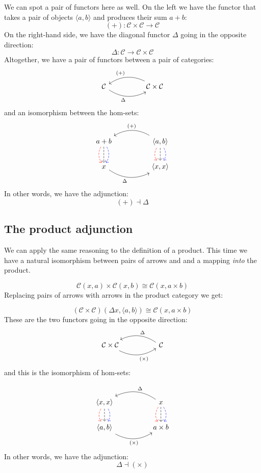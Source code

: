 \documentclass[DaoFP]{subfiles}
\begin{document}
We can spot a pair of functors here as well. On the left we have the functor that takes a pair of objects $\langle a, b \rangle$ and produces their sum $a + b$:
\[ (+) \colon \mathcal{C} \times \mathcal{C} \to \mathcal{C}\]
On the right-hand side, we have the diagonal functor $\Delta$ going in the opposite direction:
\[ \Delta \colon \mathcal{C} \to  \mathcal{C} \times \mathcal{C} \]
Altogether, we have a pair of functors between a pair of categories:
\[
 \begin{tikzcd}
  \mathcal{C}
   \arrow[rr, bend right, "\Delta"']
  &&
  \mathcal{C} \times \mathcal{C}
 \arrow[ll, bend right, "(+)"']
  \end{tikzcd}
\]
and an isomorphism between the hom-sets:
\[
 \begin{tikzcd}
a + b
\arrow[d, bend right, red, dashed]
\arrow[d, dashed]
\arrow[d, bend left, blue, dashed]
  &&
 \langle a , b \rangle
\arrow[d, bend right, red, dashed]
\arrow[d, dashed]
\arrow[d, bend left, blue, dashed]
 \arrow[ll, bend right, "(+)"']
 \\
 x
   \arrow[rr, bend right, "\Delta"']
 &&
 \langle x, x \rangle
  \end{tikzcd}
\]
In other words, we have the adjunction:
\[ (+) \dashv \Delta \]


\subsection{The product adjunction}

We can apply the same reasoning to the definition of a product. This time we have a natural isomorphism between pairs of arrows and and a mapping \emph{into} the product.

\[  \mathcal{C} (x, a) \times \mathcal{C}(x, b) \cong  \mathcal{C} (x, a \times b)  \]
Replacing pairs of arrows with arrows in the product category we get:

\[  (\mathcal{C} \times \mathcal{C})( \Delta x,  \langle a, b \rangle ) \cong  \mathcal{C} (x, a \times b)  \]
These are the two functors going in the opposite direction:
\[
 \begin{tikzcd}
  \mathcal{C} \times \mathcal{C}
  \arrow[rr, bend right, "(\times)"']
  &&
  \mathcal{C}
  \arrow[ll, bend right, "\Delta"']
  \end{tikzcd}
\]
and this is the isomorphism of hom-sets:

\[
 \begin{tikzcd}
 \langle x, x \rangle
\arrow[d, bend right, red, dashed]
\arrow[d, dashed]
\arrow[d, bend left, blue, dashed]
  &&
  x
\arrow[d, bend right, red, dashed]
\arrow[d, dashed]
\arrow[d, bend left, blue, dashed]
 \arrow[ll, bend right, "\Delta"']
 \\
 \langle a , b \rangle
   \arrow[rr, bend right, "(\times)"']
 &&
 a \times b
  \end{tikzcd}
\]
In other words, we have the adjunction:
\[ \Delta \dashv (\times) \]
\end{document}
